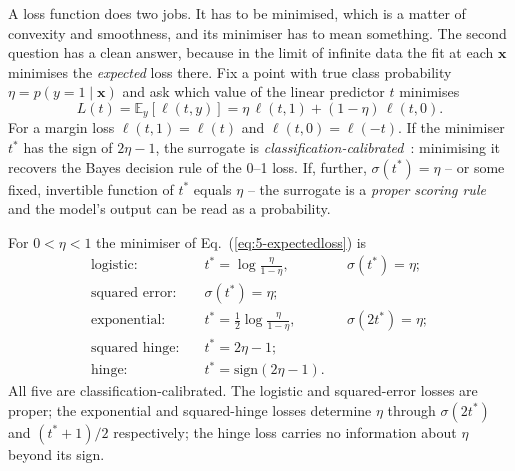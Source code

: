 A loss function does two jobs.  It has to be minimised, which is a matter of
convexity and smoothness, and its minimiser has to mean something.  The
second question has a clean answer, because in the limit of infinite data the
fit at each $\bm{x}$ minimises the \emph{expected} loss there.  Fix a point
with true class probability $\eta=p(y=1\mid\bm{x})$ and ask which value of the
linear predictor $t$ minimises
\begin{equation}
  L(t) = \mathbb{E}_{y}\left[\ell(t,y)\right]
       = \eta\,\ell(t,1) + (1-\eta)\,\ell(t,0).
  \label{eq:5-expectedloss}
\end{equation}
For a margin loss $\ell(t,1)=\ell(t)$ and $\ell(t,0)=\ell(-t)$.  If the
minimiser $t^{*}$ has the sign of $2\eta-1$, the surrogate is
\emph{classification-calibrated}~\cite{bartlett2006}: minimising it recovers
the Bayes decision rule of the 0--1 loss.  If, further, $\sigma(t^{*})=\eta$
-- or some fixed, invertible function of $t^{*}$ equals $\eta$ -- the
surrogate is a \emph{proper scoring rule}~\cite{brier1950,gneiting2007} and the
model's output can be read as a probability.

\begin{proposition}
\label{prop:5-bayeslosses}
For $0<\eta<1$ the minimiser of Eq.~(\ref{eq:5-expectedloss}) is
\begin{align}
  \text{logistic:}\quad
    &t^{*}=\log\frac{\eta}{1-\eta},
    &&\sigma(t^{*})=\eta;
  \label{eq:5-bayeslogistic}\\
  \text{squared error:}\quad
    &\sigma(t^{*})=\eta;
  \label{eq:5-bayessquared}\\
  \text{exponential:}\quad
    &t^{*}=\tfrac12\log\frac{\eta}{1-\eta},
    &&\sigma(2t^{*})=\eta;
  \label{eq:5-bayesexp}\\
  \text{squared hinge:}\quad
    &t^{*}=2\eta-1;
  \label{eq:5-bayessqhinge}\\
  \text{hinge:}\quad
    &t^{*}=\mathrm{sign}(2\eta-1).
  \label{eq:5-bayeshinge}
\end{align}
All five are classification-calibrated.  The logistic and squared-error
losses are proper; the exponential and squared-hinge losses determine $\eta$
through $\sigma(2t^{*})$ and $(t^{*}+1)/2$ respectively; the hinge loss
carries no information about $\eta$ beyond its sign.
\end{proposition}

